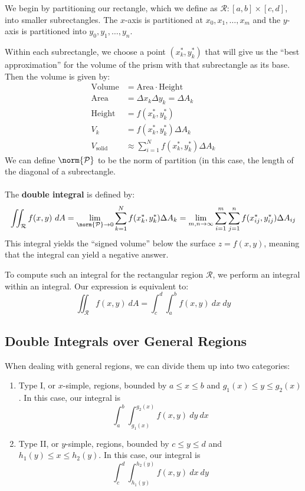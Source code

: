 \documentclass[12pt]{article}
\begin{document}
We begin by partitioning our rectangle, which we define as $\mathcal{R}: [a,b] \times [c,d]$, into smaller subrectangles. The $x$-axis is partitioned at $x_0,x_1,\dots,x_m$ and the $y$-axis is partitioned into $y_0,y_1,\dots,y_n$. 

Within each subrectangle, we choose a point $(x_k^*,y_k^*)$ that will give us the ``best approximation'' for the volume of the prism with that subrectangle as its base. Then the volume is given by:
\[
\begin{aligned}
\text{Volume} &= \text{Area} \cdot \text{Height} \\
\text{Area} &= \Delta x_k \Delta y_k = \Delta A_k \\
\text{Height} &= f(x_k^*,y_k^*) \\
V_k &= f(x_k^*,y_k^*)\Delta A_k \\
V_{\text{solid}} &\approx \sum_{i=1}^Nf(x_k^*,y_k^*)\Delta A_k
\end{aligned}
\]
We can define $\norm{\mathcal{P}}$ to be the norm of partition (in this case, the length of the diagonal of a subrectangle. \\ \\
The \textbf{double integral} is defined by:
\[ \iint_{\mathcal{R}} f(x,y) \ dA = \lim_{\norm{\mathcal{P}} \to 0} \sum_{k=1}^N f(x_k^*,y_k^*)\Delta A_k = \lim_{m,n \to \infty} \sum_{i=1}^m\sum_{j=1}^nf(x_{ij}^*,y_{ij}^*)\Delta A_{ij} \]
This integral yields the ``signed volume'' below the surface $z = f(x,y)$, meaning that the integral can yield a negative answer.

To compute such an integral for the rectangular region $\mathcal{R}$, we perform an integral within an integral. Our expression is equivalent to:
\[ \iint_{\mathcal{R}} f(x,y) \ dA = \int_c^d\int_a^b f(x,y) \ dx \ dy \]

\subsection{Double Integrals over General Regions}
When dealing with general regions, we can divide them up into two categories:
\begin{enumerate}
\item Type I, or $x$-simple, regions, bounded by $a \le x \le b$ and $g_1(x) \le y \le g_2(x)$. In this case, our integral is \[ \int_a^b \int_{g_1(x)}^{g_2(x)}f(x,y) \ dy \ dx \]
\item Type II, or $y$-simple, regions, bounded by $c \le y \le d$ and $h_1(y) \le x \le h_2(y)$. In this case, our integral is \[ \int_c^d \int_{h_1(y)}^{h_2(y)}f(x,y) \ dx \ dy \]
\end{enumerate}
\end{document}
